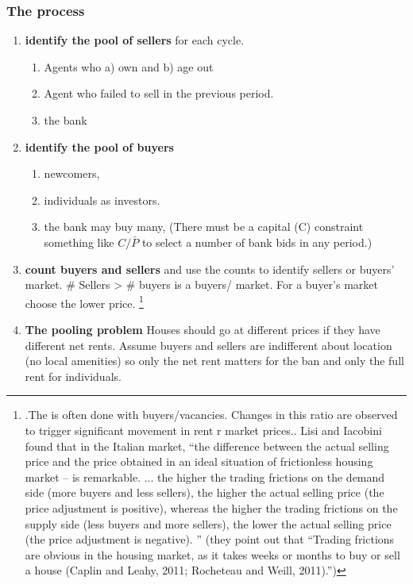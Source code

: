 \subsubsection{The process}
\begin{enumerate}
\item \textbf{identify the pool of sellers} for each cycle.
    \begin{enumerate}
        \item Agents who a) own and b) age out
        \item Agent  who failed to sell in the previous period.
        \item the bank
    \end{enumerate}
\item \textbf{identify the pool of buyers} 
    \begin{enumerate}
         \item newcomers, 
         \item individuals as investors.
         \item the bank may buy many, (There must be a capital (C) constraint something like $C/\bar P$ to select a number of bank bids in any period.)
    \end{enumerate}

\item \textbf{count buyers and sellers} and use the counts to identify sellers or buyers' market. \# Sellers > \# buyers is a buyers/ market. For a buyer's market  choose the lower price. \footnote{.The is often done with buyers/vacancies. Changes in this ratio are observed to trigger significant movement in rent r market prices.\cite{wheatonVacancySearchPrices1990}. Lisi and Iacobini \cite{lisiEstimatingHousingPrice2015} found  that in the Italian market, ``the difference between the actual selling price and the price obtained in an ideal situation of frictionless housing market – is remarkable. ... the higher the trading frictions on the demand side (more buyers and less sellers), the higher the actual selling price (the price adjustment is positive), whereas the higher the trading frictions on the supply side (less buyers and more sellers), the lower the actual selling price (the price adjustment is negative). '' (they point out that ``Trading frictions are obvious in the housing market, as it takes weeks or months to buy or sell a house (Caplin and Leahy, 2011; Rocheteau and Weill, 2011).'')}  

\item \textbf{The pooling problem}  Houses should go at different prices if they have different net rents.  Assume buyers and sellers are indifferent about location (no  local amenities) so only the net rent matters for the ban and only the full rent for individuals.


\end{enumerate}
